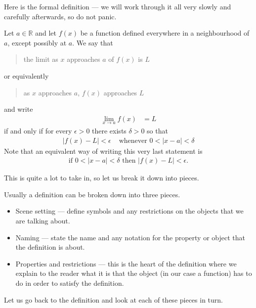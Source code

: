 Here is the formal definition --- we will work through it all very slowly and
carefully afterwards, so do not panic.
\begin{defn}
 Let $a \in \mathbb{R}$ and let $f(x)$ be a function defined everywhere in a
neighbourhood of $a$, except possibly at $a$. We say that
\begin{quote}
 the limit as $x$ approaches $a$ of $f(x)$ is $L$
\end{quote}
or equivalently
\begin{quote}
 as $x$ approaches $a$, $f(x)$ approaches $L$
\end{quote}
and write
\begin{align*}
  \lim_{x \to a} f(x) &= L
\end{align*}
if and only if for every $\epsilon >0$ there exists $\delta>0$ so that
\begin{align*}
  |f(x) - L| <\epsilon & \text{ whenever } 0<|x-a| < \delta
\end{align*}
Note that an equivalent way of writing this very last statement is
\begin{align*}
  \text{if } 0<|x-a| < \delta \text{ then } |f(x) - L| <\epsilon.
\end{align*}
\end{defn}
This is quite a lot to take in, so let us break it down into pieces.
\begin{defn}
Usually a definition can be broken down into three pieces.
 \begin{itemize}
  \item Scene setting --- define symbols and any
restrictions on the objects that we are talking about.
  \item Naming --- state the name and any notation for the property or object
that the definition is about.
  \item Properties and restrictions --- this is the heart of the definition
where we explain to the reader what it is that the object (in our case a
function) has to do in order to satisfy the definition.
 \end{itemize}
\end{defn}
Let us go back to the definition and look at each of these pieces in turn.
